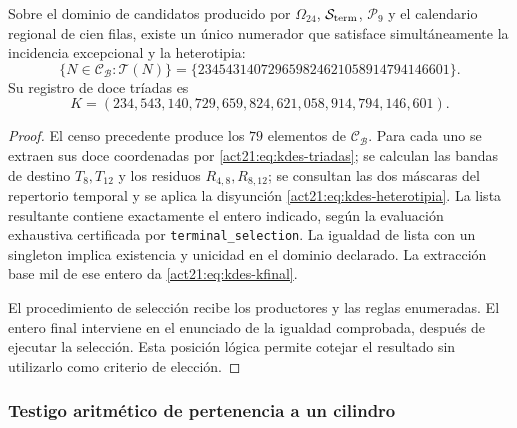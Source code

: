 \begin{theorem}
Sobre el dominio de candidatos producido por
$\Omega_{24}$, $\mathcal S_{\rm term}$, $\mathcal P_9$ y el calendario
regional de cien filas, existe un único numerador que satisface
simultáneamente la incidencia excepcional y la heterotipia:
\[
 \{N\in\mathcal C_{\mathcal B}:\mathcal T(N)\}
 =\{234543140729659824621058914794146601\}.
\]
Su registro de doce tríadas es
\begin{equation}
 K=(234,543,140,729,659,824,621,058,914,794,146,601).
 \label{act21:eq:kdes-kfinal}
\end{equation}
\end{theorem}
\begin{proof}
El censo precedente produce los $79$ elementos de
$\mathcal C_{\mathcal B}$. Para cada uno se extraen sus doce
coordenadas por \eqref{act21:eq:kdes-triadas}; se calculan las bandas de
destino $T_8,T_{12}$ y los residuos $R_{4,8},R_{8,12}$; se consultan
las dos máscaras del repertorio temporal y se aplica la disyunción
\eqref{act21:eq:kdes-heterotipia}. La lista resultante contiene exactamente
el entero indicado, según la evaluación exhaustiva certificada por
\texttt{terminal\_selection}. La igualdad de lista con un singleton
implica existencia y unicidad en el dominio declarado. La extracción
base mil de ese entero da \eqref{act21:eq:kdes-kfinal}.

El procedimiento de selección recibe los productores y las reglas
enumeradas. El entero final interviene en el enunciado de la igualdad
comprobada, después de ejecutar la selección. Esta posición lógica
permite cotejar el resultado sin utilizarlo como criterio de elección.
\end{proof}

\subsubsection{Testigo aritmético de pertenencia a un cilindro}

